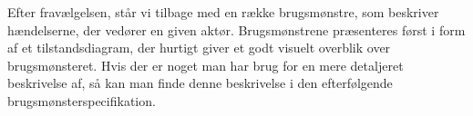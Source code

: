 Efter fravælgelsen, står vi tilbage med en række brugsmønstre, som beskriver hændelserne, der vedører en given aktør. Brugsmønstrene præsenteres først i form af et tilstandsdiagram, der hurtigt giver et godt visuelt overblik over brugsmønsteret. Hvis der er noget man har brug for en mere detaljeret beskrivelse af, så kan man finde denne beskrivelse i den efterfølgende brugsmønsterspecifikation.








